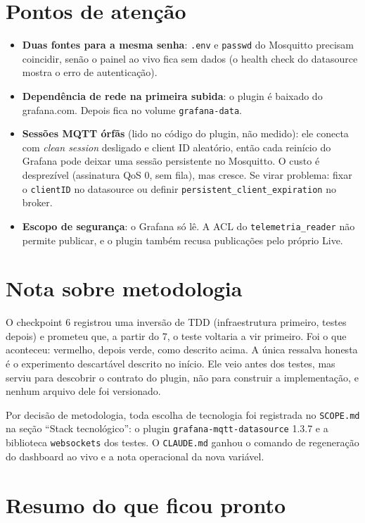 \documentclass[11pt,a4paper]{article}
\begin{document}
\section{Pontos de atenção}

\begin{itemize}
    \item \textbf{Duas fontes para a mesma senha}: \texttt{.env} e \texttt{passwd} do Mosquitto precisam coincidir, senão o painel ao vivo fica sem dados (o health check do datasource mostra o erro de autenticação).
    \item \textbf{Dependência de rede na primeira subida}: o plugin é baixado do grafana.com. Depois fica no volume \texttt{grafana-data}.
    \item \textbf{Sessões MQTT órfãs} (lido no código do plugin, não medido): ele conecta com \emph{clean session} desligado e client ID aleatório, então cada reinício do Grafana pode deixar uma sessão persistente no Mosquitto. O custo é desprezível (assinatura QoS 0, sem fila), mas cresce. Se virar problema: fixar o \texttt{clientID} no datasource ou definir \texttt{persistent\_client\_expiration} no broker.
    \item \textbf{Escopo de segurança}: o Grafana só lê. A ACL do \texttt{telemetria\_reader} não permite publicar, e o plugin também recusa publicações pelo próprio Live.
\end{itemize}

\section{Nota sobre metodologia}

O checkpoint 6 registrou uma inversão de TDD (infraestrutura primeiro, testes depois) e prometeu que, a partir do 7, o teste voltaria a vir primeiro. Foi o que aconteceu: vermelho, depois verde, como descrito acima. A única ressalva honesta é o experimento descartável descrito no início. Ele veio antes dos testes, mas serviu para descobrir o contrato do plugin, não para construir a implementação, e nenhum arquivo dele foi versionado.

Por decisão de metodologia, toda escolha de tecnologia foi registrada no \texttt{SCOPE.md} na seção ``Stack tecnológico'': o plugin \texttt{grafana-mqtt-datasource} 1.3.7 e a biblioteca \texttt{websockets} dos testes. O \texttt{CLAUDE.md} ganhou o comando de regeneração do dashboard ao vivo e a nota operacional da nova variável.

\section{Resumo do que ficou pronto}
\end{document}
